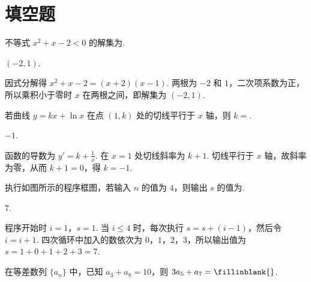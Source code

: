 \section{填空题}

\begin{problem}
不等式 \(x^{2} + x - 2 < 0\) 的解集为\fillinblank{}.
\end{problem}

\begin{answer}
\((-2,1)\).
\end{answer}

\begin{solution}
因式分解得 \(x^2+x-2=(x+2)(x-1)\). 两根为 \(-2\) 和 \(1\)，二次项系数为正，所以乘积小于零时 \(x\) 在两根之间，即解集为 \((-2,1)\).
\end{solution}

\begin{problem}
若曲线 \(y = kx + \ln x\) 在点 \((1, k)\) 处的切线平行于 \(x\) 轴，则 \(k=\)\fillinblank{}.
\end{problem}

\begin{answer}
\(-1\).
\end{answer}

\begin{solution}
函数的导数为 \(y'=k+\frac1x\). 在 \(x=1\) 处切线斜率为 \(k+1\). 切线平行于 \(x\) 轴，故斜率为零，从而 \(k+1=0\)，得 \(k=-1\).
\end{solution}

\begin{problem}
执行如图所示的程序框图，若输入 \(n\) 的值为 \(4\)，则输出 \(s\) 的值为\fillinblank{}.

\end{problem}

\begin{answer}
\(7\).
\end{answer}

\begin{solution}
程序开始时 \(i=1\)，\(s=1\). 当 \(i\leqslant4\) 时，每次执行 \(s=s+(i-1)\)，然后令 \(i=i+1\). 四次循环中加入的数依次为 \(0\)，\(1\)，\(2\)，\(3\)，所以输出值为 \(s=1+0+1+2+3=7\).
\end{solution}

\begin{problem}
在等差数列 \(\{a_{n}\}\) 中，已知 \(a_{3} + a_{8} = 10\)，则 \(3a_{5} + a_{7} =\fillinblank{}\).
\end{problem}


